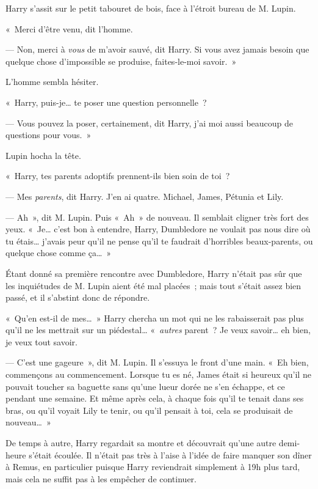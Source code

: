 Harry s'assit sur le petit tabouret de bois, face à l'étroit bureau de M. Lupin.

«~Merci d'être venu, dit l'homme.

--- Non, merci à \emph{vous} de m'avoir sauvé, dit Harry.
Si vous avez jamais besoin que quelque chose d'impossible se produise, faites-le-moi savoir.~»

L'homme sembla hésiter.

«~Harry, puis-je… te poser une question personnelle~?

--- Vous pouvez la poser, certainement, dit Harry, j'ai moi aussi beaucoup de questions pour vous.~»

Lupin hocha la tête.

«~Harry, tes parents adoptifs prennent-ils bien soin de toi~?

--- Mes \emph{parents}, dit Harry.
J'en ai quatre.
Michael, James, Pétunia et Lily.

--- Ah~», dit M. Lupin.
Puis «~Ah~» de nouveau.
Il semblait cligner très fort des yeux.
«~Je… c'est bon à entendre, Harry, Dumbledore ne voulait pas nous dire où tu étais… j'avais peur qu'il ne pense qu'il te faudrait d'horribles beaux-parents, ou quelque chose comme ça…~»

Étant donné sa première rencontre avec Dumbledore, Harry n'était pas sûr que les inquiétudes de M. Lupin aient été mal placées~; mais tout s'était assez bien passé, et il s'abstint donc de répondre.

«~Qu'en est-il de mes…~»
Harry chercha un mot qui ne les rabaisserait pas plus qu'il ne les mettrait sur un piédestal…
«~\emph{autres} parent~?
Je veux savoir… eh bien, je veux tout savoir.

--- C'est une gageure~», dit M. Lupin.
Il s'essuya le front d'une main.
«~Eh bien, commençons au commencement.
Lorsque tu es né, James était si heureux qu'il ne pouvait toucher sa baguette sans qu'une lueur dorée ne s'en échappe, et ce pendant une semaine.
Et même après cela, à chaque fois qu'il te tenait dans ses bras, ou qu'il voyait Lily te tenir, ou qu'il pensait à toi, cela se produisait de nouveau…~»

\later

De temps à autre, Harry regardait sa montre et découvrait qu'une autre demi-heure s'était écoulée.
Il n'était pas très à l'aise à l'idée de faire manquer son dîner à Remus, en particulier puisque Harry reviendrait simplement à 19h plus tard, mais cela ne suffit pas à les empêcher de continuer.


